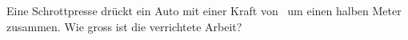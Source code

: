 Eine Schrottpresse drückt ein Auto mit einer Kraft von \FspO\ um einen halben Meter zusammen. Wie gross ist die verrichtete Arbeit?
